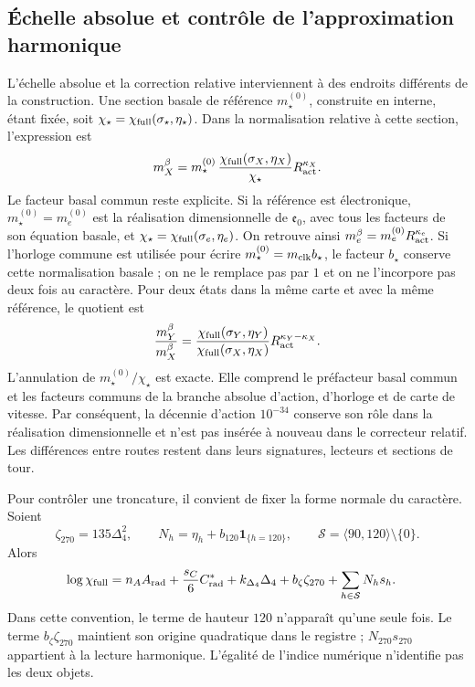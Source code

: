 \subsection{Échelle absolue et contrôle de l’approximation harmonique}
\label{vi:subsec:vi-precision-torres}

L’échelle absolue et la correction relative interviennent à des endroits
différents de la construction. Une section basale de référence
\(m_\star^{(0)}\), construite en interne, étant fixée, soit
\(\chi_\star=\chi_{\rm full}(\sigma_\star,\eta_\star)\).
Dans la normalisation relative à cette section, l’expression est
\[
 m_X^\beta=m_\star^{(0)}\,
 \frac{\chi_{\rm full}(\sigma_X,\eta_X)}{\chi_\star}
 R_{\rm act}^{\kappa_X}.
\]
Le facteur basal commun reste explicite. Si la référence est électronique,
\(m_\star^{(0)}=m_e^{(0)}\) est la réalisation dimensionnelle de
\(\mathfrak e_0\), avec tous les facteurs de son équation basale, et
\(\chi_\star=\chi_{\rm full}(\sigma_e,\eta_e)\). On retrouve ainsi
\(m_e^\beta=m_e^{(0)}R_{\rm act}^{\kappa_e}\). Si l'horloge
commune est utilisée pour écrire \(m_\star^{(0)}=m_{\rm clk}b_\star\), le
facteur \(b_\star\) conserve cette normalisation basale ; on ne le remplace
pas par \(1\) et on ne l'incorpore pas deux fois au caractère. Pour deux états
dans la même carte et avec la même référence, le quotient est
\[
 \frac{m_Y^\beta}{m_X^\beta}
 =\frac{\chi_{\rm full}(\sigma_Y,\eta_Y)}
        {\chi_{\rm full}(\sigma_X,\eta_X)}
     R_{\rm act}^{\kappa_Y-\kappa_X}.
\]
L'annulation de \(m_\star^{(0)}/\chi_\star\) est exacte. Elle comprend
le préfacteur basal commun et les facteurs communs de la branche absolue
d'action, d'horloge et de carte de vitesse. Par
conséquent, la décennie d'action \(10^{-34}\) conserve son rôle dans
la réalisation dimensionnelle et n'est pas insérée à nouveau dans le correcteur
relatif. Les différences entre routes restent dans leurs signatures, lecteurs
et sections de tour.

Pour contrôler une troncature, il convient de fixer la forme normale du caractère.
Soient
\[
 \zeta_{270}=135\Delta_4^2,\qquad
 N_h=\eta_h+b_{120}\mathbf 1_{\{h=120\}},\qquad
 \mathcal S=\langle90,120\rangle\setminus\{0\}.
\]
Alors
\[
\begin{split}
 \log\chi_{\rm full}
 ={}&n_AA_{\rm rad}+\frac{s_C}{6}C^*_{\rm rad}
       +k_{\Delta_4}\Delta_4+b_\zeta\zeta_{270}
       +\sum_{h\in\mathcal S}N_hs_h .
\end{split}
\]
Dans cette convention, le terme de hauteur \(120\) n’apparaît qu’une seule fois.
Le terme \(b_\zeta\zeta_{270}\) maintient son origine quadratique dans le
registre ; \(N_{270}s_{270}\) appartient à la lecture harmonique.
L’égalité de l’indice numérique n’identifie pas les deux objets.

